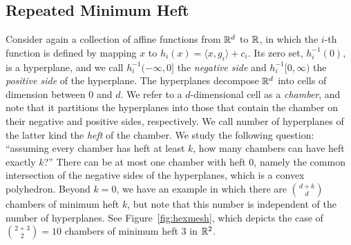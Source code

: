 \documentclass[a4paper,UKenglish,cleveref, autoref,numberwithinsect]{socg-lipics-v2021}
\newcommand {\mm}[1] {\ifmmode{#1}\else{\mbox{\(#1\)}}\fi}
\newcommand {\scalprod}[2] {{\langle #1 , #2 \rangle}}
\theoremstyle{plain}
\newcommand{\Rspace}        {\mm{{\mathbb R}}}
\begin{document}
\subsection{Repeated Minimum Heft}
\label{sec:4.3}
Consider again a collection of affine functions from $\Rspace^d$ to $\Rspace$, in which the $i$-th function is defined by mapping $x$ to $h_i (x) = \scalprod{x}{g_i} + c_i$.
Its zero set, $h_i^{-1} (0)$, is a hyperplane, and we call $h_i^{-1} (-\infty, 0]$ the \emph{negative side} and $h_i^{-1} [0, \infty)$ the \emph{positive side} of the hyperplane.
The hyperplanes decompose $\Rspace^d$ into cells of dimension between $0$ and $d$.
We refer to a $d$-dimensional cell as a \emph{chamber}, and note that it partitions the hyperplanes into those that contain the chamber on their negative and positive sides, respectively.
We call number of hyperplanes of the latter kind the \emph{heft} of the chamber.
\smallskip
We study the following question: ``assuming every chamber has heft at least $k$, how many chambers can have heft exactly $k$?''
There can be at most one chamber with heft $0$, namely the common intersection of the negative sides of the hyperplanes, which is a convex polyhedron.
Beyond $k = 0$, we have an example in which there are $\binom{d+k}{d}$ chambers of minimum heft $k$, but note that this number is independent of the number of hyperplanes.
See Figure~\ref{fig:hexmesh}, which depicts the case of $\binom{2+3}{2} = 10$ chambers of minimum heft $3$ in $\Rspace^2$.
\end{document}
